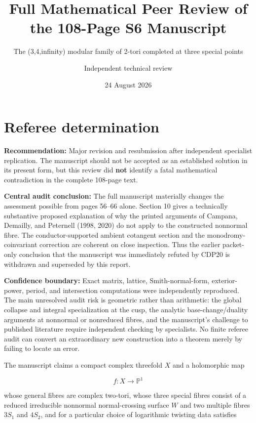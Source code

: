 \documentclass[
  10pt,
  letterpaper,
]{article}
\title{Full Mathematical Peer Review of the 108-Page S6 Manuscript}
\subtitle{The (3,4,infinity) modular family of 2-tori completed at three
special points}
\author{Independent technical review}
\date{24 August 2026}
\newcommand{\Pone}{\mathbb P^1}
\begin{document}
\maketitle

{
\hypersetup{linkcolor=}
\setcounter{tocdepth}{3}
\tableofcontents
}
\section{Referee determination}\label{referee-determination}

\textbf{Recommendation:} Major revision and resubmission after
independent specialist replication. The manuscript should not be
accepted as an established solution in its present form, but this review
did \textbf{not} identify a fatal mathematical contradiction in the
complete 108-page text.

\textbf{Central audit conclusion:} The full manuscript materially
changes the assessment possible from pages 56--66 alone. Section 10
gives a technically substantive proposed explanation of why the printed
arguments of Campana, Demailly, and Peternell (1998, 2020) do not apply
to the constructed nonnormal fibre. The conductor-supported ambient
cotangent section and the monodromy-coinvariant correction are coherent
on close inspection. Thus the earlier packet-only conclusion that the
manuscript was immediately refuted by CDP20 is withdrawn and superseded
by this report.

\textbf{Confidence boundary:} Exact matrix, lattice, Smith-normal-form,
exterior-power, period, and intersection computations were independently
reproduced. The main unresolved audit risk is geometric rather than
arithmetic: the global collapse and integral specialization at the cusp,
the analytic base-change/duality arguments at nonnormal or nonreduced
fibres, and the manuscript's challenge to published literature require
independent checking by specialists. No finite referee audit can convert
an extraordinary new construction into a theorem merely by failing to
locate an error.

The manuscript claims a compact complex threefold \(X\) and a
holomorphic map

\[
f:X\longrightarrow \Pone
\]

whose general fibres are complex two-tori, whose three special fibres
consist of a reduced irreducible nonnormal normal-crossing surface \(W\)
and two multiple fibres \(3S_1\) and \(4S_2\), and for a particular
choice of logarithmic twisting data satisfies
\end{document}
